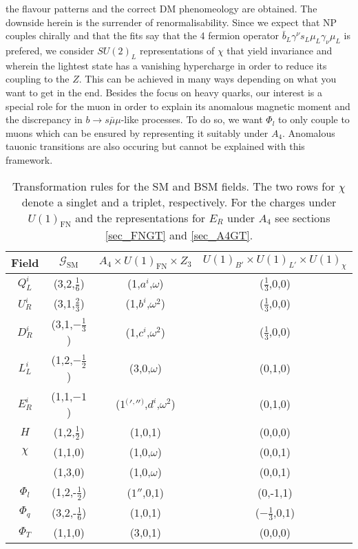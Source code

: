 the flavour patterns and the correct DM phenomeology are obtained. 
The downside herein is the surrender of renormalisability. Since we expect that NP couples chirally and that the fits say that the 4 fermion operator 
$\bar b_L \gamma^\nu s_L \mu_L \gamma_\nu \mu_L$ is prefered, we consider $SU(2)_L$ representations of $\chi$ that yield invariance and wherein the lightest
state has a vanishing hypercharge in order to reduce its coupling to the $Z$. This can be achieved in many ways depending on what you want to get 
in the end. Besides the focus on heavy quarks,
our interest is a special role for the muon in order to explain its anomalous magnetic moment and the discrepancy in  
$b\rightarrow s\bar\mu\mu$-like processes. 
To do so, we want $\Phi_l$ to only couple to muons which can be ensured by representing it suitably under $A_4$. Anomalous tauonic transitions are 
also occuring but cannot be explained with this framework.
\begin{table}[t]
 \begin{tabular}{c|c|c|c}
  Field & $\mathcal{G}_\text{SM}$ & $A_4 \times U(1)_\text{FN} \times Z_3$ & $U(1)_{B'}\times U(1)_{L'}\times U(1)_\chi$\\
  \hline
  $Q^i_L$ & (3,2,$\frac16$) & (1,$a^i$,$\omega$) & ($\frac13$,0,0)\\
  $U^i_R$ & (3,1,$\frac23$) & (1,$b^i$,$\omega^2$)& ($\frac13$,0,0)\\
  $D^i_R$ & (3,1,$-\frac13$) & (1,$c^i$,$\omega^2$)& ($\frac13$,0,0)\\
  $L^i_L$ & (1,2,$-\frac12$) & (3,0,$\omega$)& (0,1,0)\\
  $E^i_R$ & (1,1,$-1$) & ($1 {^(} {'} {^,} '' {^)} $,$d^i$,$\omega^2$)& (0,1,0)\\
  $H$ & (1,2,$\frac12$) & (1,0,1)& (0,0,0)\\
  \hline
  $\chi$ & (1,1,0) & (1,0,$\omega$)& (0,0,1)\\ %
 & (1,3,0) & (1,0,$\omega$)&(0,0,1)\\
  $\Phi_l$ & (1,2,-$\frac12$) & ($1''$,0,1)& (0,-1,1)\\
  $\Phi_q$ & (3,2,-$\frac16$) & ($1$,0,1)& ($-\frac13$,0,1)\\
  \hline
  $\Phi_T$ & (1,1,0) & ($3$,0,1)& (0,0,0)\\
 \end{tabular}
\caption{Transformation rules for the SM and BSM fields. The two rows for $\chi$ denote a singlet and a triplet, respectively. For the charges under 
$U(1)_\text{FN}$ and the representations for $E_R$ under $A_4$ see sections \ref{sec_FNGT} and \ref{sec_A4GT}.}
\label{tab_models}
\end{table}
